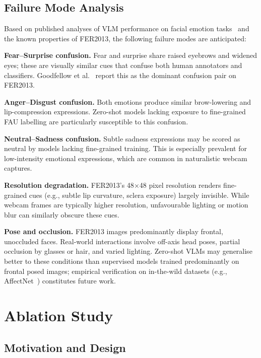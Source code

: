 \documentclass[sigconf, review=true]{acmart}
\begin{document}
\subsection{Failure Mode Analysis}

Based on published analyses of VLM performance on facial
emotion tasks~\cite{li2022fer_survey} and the known properties
of FER2013, the following failure modes are anticipated:

\textbf{Fear--Surprise confusion.}
Fear and surprise share raised eyebrows and widened eyes;
these are visually similar cues that confuse both human
annotators and classifiers.
Goodfellow et al.~\cite{goodfellow2013fer} report this as
the dominant confusion pair on FER2013.

\textbf{Anger--Disgust confusion.}
Both emotions produce similar brow-lowering and
lip-compression expressions.
Zero-shot models lacking exposure to fine-grained FAU
labelling are particularly susceptible to this confusion.

\textbf{Neutral--Sadness confusion.}
Subtle sadness expressions may be scored as neutral by
models lacking fine-grained training.
This is especially prevalent for low-intensity emotional
expressions, which are common in naturalistic webcam
captures.

\textbf{Resolution degradation.}
FER2013's 48$\times$48 pixel resolution renders fine-grained
cues (e.g., subtle lip curvature, sclera exposure) largely
invisible.
While webcam frames are typically higher resolution,
unfavourable lighting or motion blur can similarly obscure
these cues.

\textbf{Pose and occlusion.}
FER2013 images predominantly display frontal, unoccluded
faces.
Real-world interactions involve off-axis head poses, partial
occlusion by glasses or hair, and varied lighting.
Zero-shot VLMs may generalise better to these conditions
than supervised models trained predominantly on frontal
posed images; empirical verification on in-the-wild datasets
(e.g., AffectNet~\cite{mollahosseini2019affectnet}) constitutes
future work.

\section{Ablation Study}
\label{sec:ablation}

\subsection{Motivation and Design}
\end{document}
